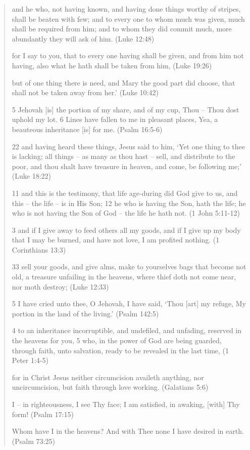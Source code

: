 \documentclass[11pt]{article}
\begin{document}
\begin{quote}
and he who, not having known, and having done things worthy of stripes, shall be beaten with few; and to every one to whom much was given, much shall be required from him; and to whom they did commit much, more abundantly they will ask of him. (Luke 12:48)

for I say to you, that to every one having shall be given, and from him not having, also what he hath shall be taken from him, (Luke 19:26)


but of one thing there is need, and Mary the good part did choose, that shall not be taken away from her.' (Luke 10:42)


5 Jehovah [is] the portion of my share, and of my cup, Thou -- Thou dost uphold my lot.
6 Lines have fallen to me in pleasant places, Yea, a beauteous inheritance [is] for me. (Psalm 16:5-6)

22 and having heard these things, Jesus said to him, `Yet one thing to thee is lacking; all things -- as many as thou hast -- sell, and distribute to the poor, and thou shalt have treasure in heaven, and come, be following me;' (Luke 18:22)


11 and this is the testimony, that life age-during did God give to us, and this -- the life -- is in His Son;
12 he who is having the Son, hath the life; he who is not having the Son of God -- the life he hath not. (1 John 5:11-12)

3 and if I give away to feed others all my goods, and if I give up my body that I may be burned, and have not love, I am profited nothing. (1 Corinthians 13:3)

33 sell your goods, and give alms, make to yourselves bags that become not old, a treasure unfailing in the heavens, where thief doth not come near, nor moth destroy; (Luke 12:33)

5 I have cried unto thee, O Jehovah, I have said, `Thou [art] my refuge, My portion in the land of the living.' (Psalm 142:5)

4 to an inheritance incorruptible, and undefiled, and unfading, reserved in the heavens for you,
5 who, in the power of God are being guarded, through faith, unto salvation, ready to be revealed in the last time, (1 Peter 1:4-5)

for in Christ Jesus neither circumcision availeth anything, nor uncircumcision, but faith through love working. (Galatians 5:6)

I -- in righteousness, I see Thy face; I am satisfied, in awaking, [with] Thy form! (Psalm 17:15)

Whom have I in the heavens? And with Thee none I have desired in earth. (Psalm 73:25)
\end{quote}
\end{document}
